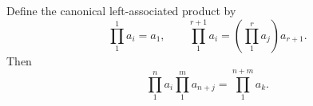 Define the canonical left-associated product by
$$\prod_{1}^{1} a_i = a_1, \qquad \prod_{1}^{r+1} a_i = \left( \prod_{1}^{r} a_j \right) a_{r+1}.$$
Then
$$\prod_{1}^{n} a_i \prod_{1}^{m} a_{n+j} = \prod_{1}^{n+m} a_k.$$
